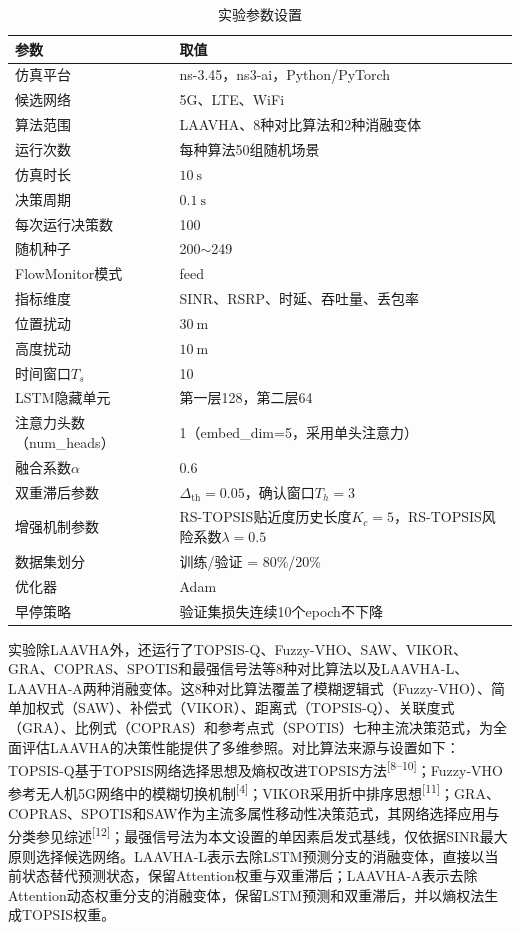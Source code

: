 \documentclass[10pt,a4paper]{ctexart}
\newcommand{\upcite}[1]{\textsuperscript{[#1]}}
\begin{document}
\begin{table}[H]
\centering
\caption{实验参数设置}
\small
\begin{tabular}{>{\raggedright\arraybackslash}p{3.2cm}p{8.5cm}}
\toprule
参数 & 取值 \\
\midrule
仿真平台 & ns-3.45，ns3-ai，Python/PyTorch \\
候选网络 & 5G、LTE、WiFi \\
算法范围 & LAAVHA、8种对比算法和2种消融变体 \\
运行次数 & 每种算法50组随机场景 \\
仿真时长 & $10~\mathrm{s}$ \\
决策周期 & $0.1~\mathrm{s}$ \\
每次运行决策数 & 100 \\
随机种子 & 200$\sim$249 \\
FlowMonitor模式 & feed \\
指标维度 & SINR、RSRP、时延、吞吐量、丢包率 \\
位置扰动 & $30~\mathrm{m}$ \\
高度扰动 & $10~\mathrm{m}$ \\
时间窗口$T_s$ & 10 \\
LSTM隐藏单元 & 第一层128，第二层64 \\
注意力头数（num\_heads） & 1（embed\_dim=5，采用单头注意力） \\
融合系数$\alpha$ & 0.6 \\
双重滞后参数 & $\Delta_{\mathrm{th}}=0.05$，确认窗口$T_h=3$ \\
增强机制参数 & RS-TOPSIS贴近度历史长度$K_c=5$，RS-TOPSIS风险系数$\lambda=0.5$ \\
数据集划分 & 训练/验证 = 80\%/20\% \\
优化器 & Adam \\
早停策略 & 验证集损失连续10个epoch不下降 \\
\bottomrule
\end{tabular}
\label{tab:params}
\end{table}

实验除LAAVHA外，还运行了TOPSIS-Q、Fuzzy-VHO、SAW、VIKOR、GRA、COPRAS、SPOTIS和最强信号法等8种对比算法以及LAAVHA-L、LAAVHA-A两种消融变体。这8种对比算法覆盖了模糊逻辑式（Fuzzy-VHO）、简单加权式（SAW）、补偿式（VIKOR）、距离式（TOPSIS-Q）、关联度式（GRA）、比例式（COPRAS）和参考点式（SPOTIS）七种主流决策范式，为全面评估LAAVHA的决策性能提供了多维参照。对比算法来源与设置如下：TOPSIS-Q基于TOPSIS网络选择思想及熵权改进TOPSIS方法\upcite{8--10}；Fuzzy-VHO参考无人机5G网络中的模糊切换机制\upcite{4}；VIKOR采用折中排序思想\upcite{11}；GRA、COPRAS、SPOTIS和SAW作为主流多属性移动性决策范式，其网络选择应用与分类参见综述\upcite{12}；最强信号法为本文设置的单因素启发式基线，仅依据SINR最大原则选择候选网络。LAAVHA-L表示去除LSTM预测分支的消融变体，直接以当前状态替代预测状态，保留Attention权重与双重滞后；LAAVHA-A表示去除Attention动态权重分支的消融变体，保留LSTM预测和双重滞后，并以熵权法生成TOPSIS权重。
\end{document}
